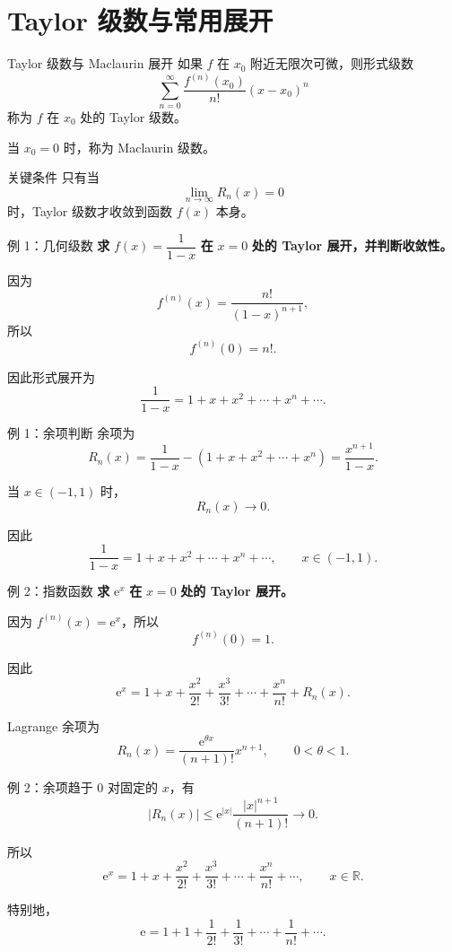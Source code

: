 \documentclass[aspectratio=169,11pt]{ctexbeamer}
\newcommand{\R}{\mathbb{R}}
\newcommand{\ee}{\mathrm{e}}
\newcommand{\abs}[1]{\left|#1\right|}
\begin{document}
\section{Taylor 级数与常用展开}

\begin{frame}{Taylor 级数与 Maclaurin 展开}
\small
如果 $f$ 在 $x_0$ 附近无限次可微，则形式级数
\[
  \sum_{n=0}^{\infty}
  \frac{f^{(n)}(x_0)}{n!}(x-x_0)^n
\]
称为 $f$ 在 $x_0$ 处的 Taylor 级数。

当 $x_0=0$ 时，称为 Maclaurin 级数。

\begin{block}{关键条件}
只有当
\[
  \lim_{n\to\infty}R_n(x)=0
\]
时，Taylor 级数才收敛到函数 $f(x)$ 本身。
\end{block}
\end{frame}

\begin{frame}{例 1：几何级数}
\small
\textbf{求} $f(x)=\dfrac1{1-x}$ \textbf{在} $x=0$ \textbf{处的 Taylor 展开，并判断收敛性。}

\vspace{0.6em}
因为
\[
  f^{(n)}(x)=\frac{n!}{(1-x)^{n+1}},
\]
所以
\[
  f^{(n)}(0)=n!.
\]

因此形式展开为
\[
  \frac1{1-x}=1+x+x^2+\cdots+x^n+\cdots.
\]
\end{frame}

\begin{frame}{例 1：余项判断}
\small
余项为
\[
  R_n(x)
  =
  \frac1{1-x}-(1+x+x^2+\cdots+x^n)
  =
  \frac{x^{n+1}}{1-x}.
\]

当 $x\in(-1,1)$ 时，
\[
  R_n(x)\to0.
\]

因此
\[
  \frac1{1-x}=1+x+x^2+\cdots+x^n+\cdots,\qquad x\in(-1,1).
\]
\end{frame}

\begin{frame}{例 2：指数函数}
\small
\textbf{求} $\ee^x$ \textbf{在} $x=0$ \textbf{处的 Taylor 展开。}

\vspace{0.6em}
因为 $f^{(n)}(x)=\ee^x$，所以
\[
  f^{(n)}(0)=1.
\]

因此
\[
  \ee^x
  =
  1+x+\frac{x^2}{2!}+\frac{x^3}{3!}
  +\cdots+\frac{x^n}{n!}+R_n(x).
\]

Lagrange 余项为
\[
  R_n(x)=\frac{\ee^{\theta x}}{(n+1)!}x^{n+1},\qquad 0<\theta<1.
\]
\end{frame}

\begin{frame}{例 2：余项趋于 $0$}
\small
对固定的 $x$，有
\[
  \abs{R_n(x)}
  \le
  \ee^{\abs{x}}\frac{\abs{x}^{n+1}}{(n+1)!}
  \to0.
\]

所以
\[
  \ee^x
  =
  1+x+\frac{x^2}{2!}+\frac{x^3}{3!}
  +\cdots+\frac{x^n}{n!}+\cdots,
  \qquad x\in\R.
\]

特别地，
\[
  \ee=1+1+\frac1{2!}+\frac1{3!}+\cdots+\frac1{n!}+\cdots.
\]
\end{frame}
\end{document}
